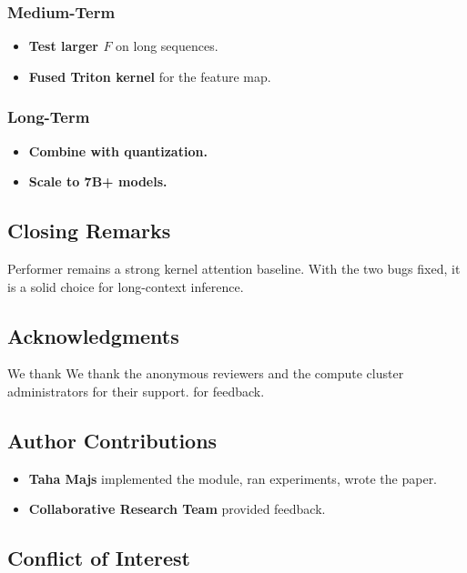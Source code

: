 \subsubsection{Medium-Term}

\begin{itemize}
\item \textbf{Test larger $F$} on long sequences.
\item \textbf{Fused Triton kernel} for the feature map.

\end{itemize}
\subsubsection{Long-Term}

\begin{itemize}
\item \textbf{Combine with quantization.}
\item \textbf{Scale to 7B+ models.}

\end{itemize}
\subsection{Closing Remarks}

Performer remains a strong kernel attention baseline. With the two bugs 
fixed, it is a solid choice for long-context inference.

\subsection{Acknowledgments}

We thank We thank the anonymous reviewers and the compute cluster administrators for their support. for feedback.

\subsection{Author Contributions}

\begin{itemize}
\item \textbf{Taha Majs} implemented the module, ran experiments, wrote the paper.
\item \textbf{Collaborative Research Team} provided feedback.

\end{itemize}
\subsection{Conflict of Interest}

